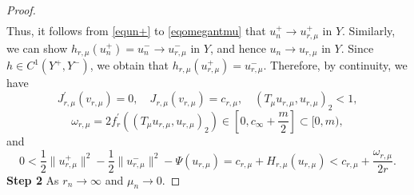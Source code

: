 \documentclass[11pt]{amsart}
\newcommand{\norm}[1]{\lVert#1\rVert}
\numberwithin{equation}{section}
\begin{document}
\begin{proof}
\begin{equation}
\begin{aligned}
\end{aligned}
\end{equation}
Thus, it follows from \eqref{equn+} to \eqref{eqomegantmu} that $u_{n}^{+} \to u_{r, \mu}^{+}$ in $Y$. Similarly, we can show $h_{r,\mu}(u_n^+) = u_{n}^{-} \to u_{r, \mu}^{-}$ in $Y$, and hence $u_{n} \to u_{r, \mu}$ in $Y$. Since $h \in C^1(Y^+, Y^-)$, we obtain that $h_{r,\mu}(u_{r,\mu}^+) = u_{r, \mu}^{-}$. Therefore, by continuity, we have
$$
J_{r, \mu}^{\prime}(v_{r, \mu})=0, \quad J_{r, \mu}(v_{r, \mu})=c_{r, \mu}, \quad (T_{\mu} u_{r, \mu}, u_{r, \mu})_{2}<1,
$$
$$
\omega_{r, \mu}=2 f_{r}^{\prime}((T_{\mu} u_{r, \mu}, u_{r, \mu})_{2}) \in[0, c_{\infty}+\frac{m}{2}] \subset[0, m),
$$
and
$$
0<
\frac{1}{2}\norm{u_{r, \mu}^+}^2 - \frac{1}{2}\norm{u_{r, \mu}^-}^2-\Psi(u_{r, \mu})=c_{r, \mu}+H_{r, \mu}(u_{r, \mu})<c_{r, \mu}+\frac{\omega_{r, \mu}}{2r}.
$$
{\bf Step 2} As $r_{n} \to \infty$ and $\mu_{n} \to 0$.


\end{proof}
\end{document}
